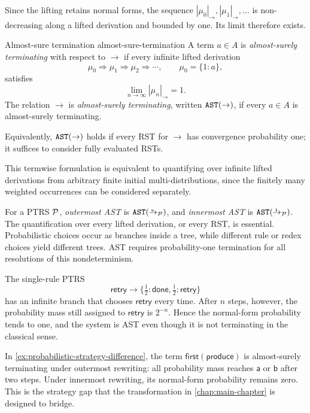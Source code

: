 Since the lifting retains normal forms, the sequence
$|\mu_0|_{\to},|\mu_1|_{\to},\ldots$ is non-decreasing along a lifted
derivation and bounded by one.  Its limit therefore exists.

\begin{Definition}{Almost-sure termination
  \cite{avanzini_dallago_yamada_2020}}{almost-sure-termination}
  A term $a\in A$ is \emph{almost-surely terminating} with respect to
  $\to$ if every infinite lifted derivation
  \[
    \mu_0\Rightarrow\mu_1\Rightarrow\mu_2\Rightarrow\cdots,
    \qquad \mu_0=\{1:a\},
  \]
  satisfies
  \[
    \lim_{n\to\infty}|\mu_n|_{\to}=1.
  \]
  The relation $\to$ is \emph{almost-surely terminating}, written
  $\AST[\to]$, if every $a\in A$ is almost-surely terminating.

  Equivalently, $\AST[\to]$ holds if every RST for $\to$ has convergence
  probability one; it suffices to consider fully evaluated RSTs.
\end{Definition}

This termwise formulation is equivalent to quantifying over infinite lifted
derivations from arbitrary finite initial multi-distributions, since the
finitely many weighted occurrences can be considered separately.

For a PTRS $\P$, \emph{outermost AST} is $\AST[\oto_\P]$, and
\emph{innermost AST} is $\AST[\ito_\P]$.  The quantification over every lifted
derivation, or every RST, is essential.  Probabilistic choices occur as branches
inside a tree, while different rule or redex choices yield different trees.  AST
requires probability-one termination for all resolutions of this
nondeterminism.

\begin{example}\label{ex:ast-versus-sure-termination}
  The single-rule PTRS
  \[
    \mathsf{retry}
      \to\{\tfrac12:\mathsf{done},\tfrac12:\mathsf{retry}\}
  \]
  has an infinite branch that chooses $\mathsf{retry}$ every time.  After $n$
  steps, however, the probability mass still assigned to $\mathsf{retry}$ is
  $2^{-n}$.  Hence the normal-form probability tends to one, and the system is
  AST even though it is not terminating in the classical sense.
\end{example}

In \cref{ex:probabilistic-strategy-difference}, the term
$\mathsf{first}(\mathsf{produce})$ is almost-surely terminating under outermost
rewriting: all probability mass reaches $\mathsf a$ or $\mathsf b$ after two
steps.  Under innermost rewriting, its normal-form probability remains zero.
This is the strategy gap that the transformation in \cref{chap:main-chapter}
is designed to bridge.

